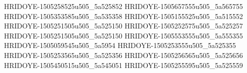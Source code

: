HRIDOYE-1505258525u505_5a525852
HRIDOYE-1505657555u505_5a565755
HRIDOYE-1505353585u505_5a535358
HRIDOYE-1505155525u505_5a515552
HRIDOYE-1505251505u505_5a525150
HRIDOYE-1505252575u505_5a525257
HRIDOYE-1505251505u505_5a525150
HRIDOYE-1505553555u505_5a555355
HRIDOYE-1505059545u505_5a5954
HRIDOYE-1505253555u505_5a525355
HRIDOYE-1505253565u505_5a525356
HRIDOYE-1505256565u505_5a525656
HRIDOYE-1505450515u505_5a545051
HRIDOYE-1505255595u505_5a525559
